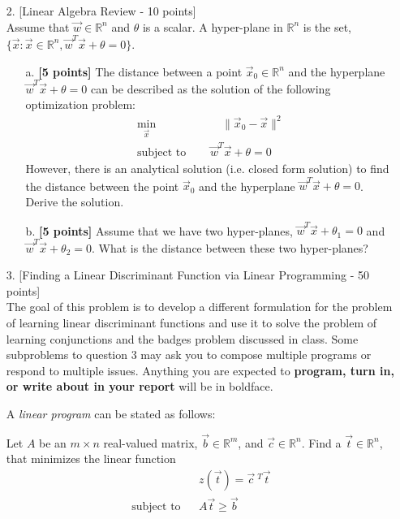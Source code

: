 \begin{enumerate}
\begin{enumerate}
\end{enumerate}

\item[2.] [Linear Algebra Review - 10 points] \\
	Assume that $\vec{w}\in \mathbb{R}^n$ and $\theta$
    is a scalar. A hyper-plane in $\mathbb{R}^n$ is the set, $
    \{ \vec{x}: \vec{x} \in \mathbb{R}^n, \vec{w}^T \vec{x} + \theta = 0 \}$.
	\begin{enumerate}
	\item [a.] \textbf{[5 points]} The distance between a point $\vec{x}_0 \in
	\mathbb{R}^n$ and the hyperplane $\vec{w}^T \vec{x} + \theta = 0$
	can be described as the solution of the following optimization problem:
	\begin{align*}
    	\min_{\vec{x}} & \qquad \| \vec{x}_0 - \vec{x} \|^2 \\
		\textrm{subject to } & \quad \vec{w}^T \vec{x} + \theta = 0
	\end{align*}
	However, there is an analytical solution (i.e. closed form solution) to find the distance between
	the point $\vec{x}_0$ and the hyperplane $\vec{w}^T \vec{x} + \theta = 0$. 
	Derive the solution. 
	\item [b.]  \textbf{[5 points]} Assume that we have two hyper-planes,
	$\vec{w}^T \vec{x} + \theta_1 = 0$ and $\vec{w}^T \vec{x} + \theta_2 = 0$. 
	What is the distance between these two hyper-planes?
	\end{enumerate}

\item[3.] [Finding a Linear Discriminant Function via Linear Programming - 50 points] \\
The goal of this problem is to develop a different formulation for the problem
of learning linear discriminant functions and use it to solve the problem of
learning conjunctions and the badges problem
discussed in class.
Some subproblems to question 3 may ask you to compose multiple programs or respond to multiple issues.
Anything you are expected to {\bf program, turn in, or write about in your report} will be in boldface.


\begin{definition}
A {\em linear program} can be stated as follows:

Let 
$A$ be an $m \times n$ real-valued matrix,
$\vec{b} \in \mathbb{R}^m$, and $\vec{c} \in \mathbb{R}^n$.
Find a $\vec{t} \in \mathbb{R}^n$, that minimizes the linear function
\begin{eqnarray*}
  & & z(\vec{t}) = \vec{c}~^T \vec{t} \\
\textrm{subject to} & & A \vec{t} \geq \vec{b}
\end{eqnarray*}
\end{definition}


\end{enumerate}
